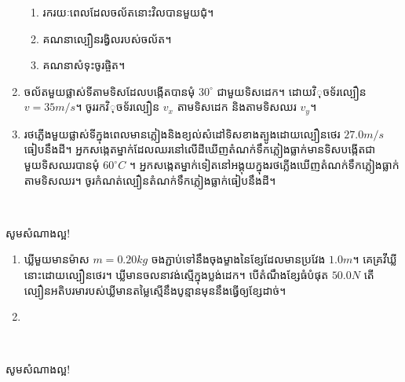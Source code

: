 \documentclass{officialexam}
\begin{document}
\begin{enumerate}[m]
		\begin{enumerate}[k]
			\item រករយៈពេលដែលចល័តនោះវិលបានមួយជុំ។
			\item គណនាល្បឿនរង្វិលរបស់ចល័ត។
			\item គណនាសំទុះចូរផ្ចិត។
		\end{enumerate}
		\item ចល័តមួយផ្លាស់ទីតាមទិសដែលបង្កើតបានមុំ $30^\circ$ ជាមួយទិសដេក។ ដោយវិុចទ័រល្បឿន $v=35m/s$។ ចូររកវិុចទ័រល្បឿន $v_x$ តាមទិសដេក និងតាមទិសឈរ $v_y$។
		\item រថភ្លើងមួយផ្លាស់ទីក្នុងពេលមានភ្លៀងនិងខ្យល់សំដៅទិសខាងត្បូងដោយល្បឿនថេរ $27.0m/s$ ធៀបនឹងដី។ អ្នកសង្កេតម្នាក់ដែលឈរនៅលើដីឃើញតំណក់ទឹកភ្លៀងធ្លាក់មានទិសបង្កើតជាមួយទិសឈរបានមុំ $60^\circ C$ ។ អ្នកសង្កេតម្នាក់ទៀតនៅអង្គុយក្នុងរថភ្លើងឃើញតំណក់ទឹកភ្លៀងធ្លាក់តាមទិសឈរ។ ចូរកំណត់ល្បឿនតំណក់ទឹកភ្លៀងធ្លាក់ធៀបនឹងដី។
	\end{enumerate}
\\
\begin{center}
	\sffamily\color{blue}
	សូមសំណាងល្អ!
\end{center}\newpage
{}
\begin{enumerate}[m]
	\item ឃ្លីមួយមានម៉ាស $m=0.20kg$ ចងភ្ជាប់ទៅនឹងចុងម្ខាងនៃខ្សែដែលមានប្រវែង $1.0m$។ គេគ្រវីឃ្លីនោះដោយល្បឿនថេរ។ ឃ្លីមានចលនាវង់ស្មើក្នុងប្លង់ដេក។ បើតំណឹងខ្សែធំបំផុត $50.0N$ តើល្បឿនអតិបរមារបស់ឃ្លីមានតម្លៃស្មើនឹងបូន្មានមុននឹងធ្វើឲ្យខ្សែដាច់។
	\item 
\end{enumerate}
\\
\begin{center}
	\sffamily\color{blue}
	សូមសំណាងល្អ!
\end{center}\newpage
\end{document}

